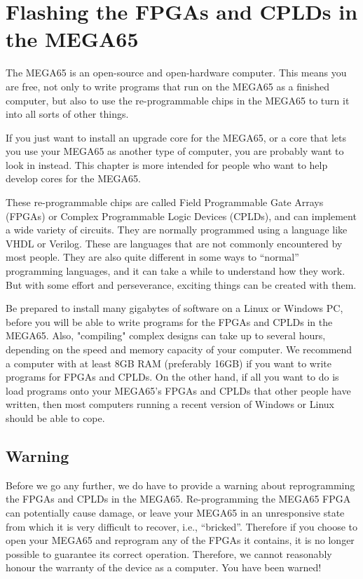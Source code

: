 \chapter{Flashing the FPGAs and CPLDs in the MEGA65}
\label{cha:fpgacpldflashing}

The MEGA65 is an open-source and open-hardware computer. This means you are free,
not only to write programs that run on the MEGA65 as a finished computer, but also to
use the re-programmable chips in the MEGA65 to turn it into all sorts of other things.

If you just want to install an upgrade core for the MEGA65, or a core that lets you use
your MEGA65 as another type of computer, you are probably want to look in
 instead.
This chapter is more intended for people who want to help develop cores for the MEGA65.

These re-programmable chips are called Field Programmable Gate Arrays (FPGAs) or
Complex Programmable Logic Devices (CPLDs), and can implement a wide variety of circuits.
They are normally programmed using a language like VHDL or Verilog.  These
are languages that are not commonly encountered by most people.  They are also quite
different in some ways to ``normal'' programming languages, and it can take a while to
understand how they work. But with some effort and perseverance, exciting things can be created with them.

Be prepared to install many gigabytes of software on a Linux or Windows PC, before you will
be able to write programs for the FPGAs and CPLDs in the MEGA65.  Also,
"compiling" complex
designs can take up to several hours, depending on the speed and memory
capacity of your computer.
We recommend a computer with at least 8GB RAM (preferably 16GB) if you want to write
programs for FPGAs and CPLDs. On the other hand, if all you want to do is load programs onto
your MEGA65's FPGAs and CPLDs that other people have written, then most
computers running a recent
version of Windows or Linux should be able to cope.

\section{Warning}

Before we go any further, we do have to provide a warning about reprogramming the FPGAs and
CPLDs in the MEGA65.
Re-programming the MEGA65 FPGA can potentially cause
damage, or leave your MEGA65 in an unresponsive state from which it is very difficult to
recover, i.e., ``bricked''.  Therefore if you choose to open your MEGA65 and reprogram
any of the FPGAs it contains, it is no longer possible to guarantee its correct operation.
Therefore, we cannot reasonably honour the warranty of the
device as a computer.
You have been warned!

